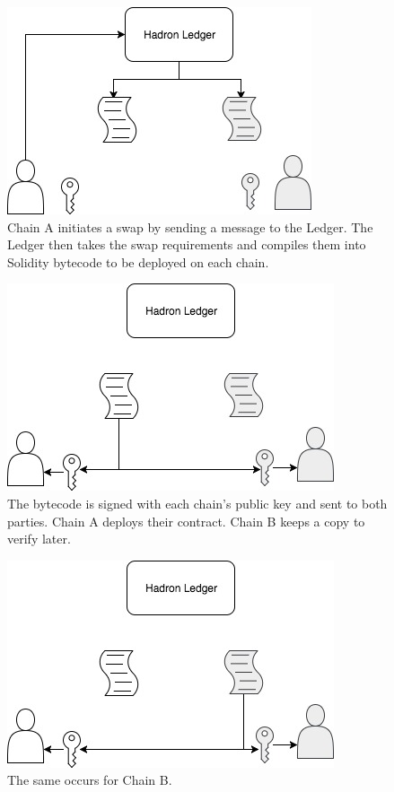 \documentclass{%
	article}
\begin{document}
\begin{figure}[htbp!]
\centering
\includegraphics[scale=0.5]{fig1.jpg}
\caption{Chain A initiates a swap by sending a message to the Ledger. The Ledger then takes the swap requirements and compiles them into Solidity bytecode to be deployed on each chain.}
\end{figure}

\begin{figure}[htbp!]
\centering
\includegraphics[scale=0.5]{fig2.jpg}
\caption{The bytecode is signed with each chain's public key and sent to both parties. Chain A deploys their contract. Chain B keeps a copy to verify later.}
\end{figure}

\begin{figure}[htbp!]
\centering
\includegraphics[scale=0.5]{fig3.jpg}
\caption{The same occurs for Chain B.}
\end{figure}
\end{document}
